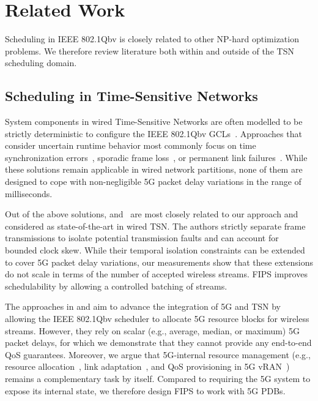 \section{Related Work}
\label{sec:related_work}
Scheduling in IEEE 802.1Qbv is closely related to other NP-hard optimization problems.
We therefore review literature both within and outside of the TSN scheduling domain.

\subsection{Scheduling in Time-Sensitive Networks}
System components in wired Time-Sensitive Networks are often modelled to be strictly deterministic to configure the IEEE 802.1Qbv GCLs~\cite{nwps,10228875,10.1145/3139258.3139289,8894249}.
Approaches that consider uncertain runtime behavior most commonly focus on time synchronization errors~\cite{10228980,10144237,Craciunas2016RTNS}, sporadic frame loss~\cite{Craciunas2016RTNS,10.1145/3458768,FENG2022102381,9488750}, or permanent link failures~\cite{9488750,8607244,8474201,reusch2022dependability}.
While these solutions remain applicable in wired network partitions, none of them are designed to cope with non-negligible 5G packet delay variations in the range of milliseconds.

Out of the above solutions, \cite{nwps} and~\cite{Craciunas2016RTNS} are most closely related to our approach and considered as state-of-the-art in wired TSN.
The authors strictly separate frame transmissions to isolate potential transmission faults and can account for bounded clock skew.
While their temporal isolation constraints can be extended to cover 5G packet delay variations, our measurements show that these extensions do not scale in terms of the number of accepted wireless streams.
FIPS improves schedulability by allowing a controlled batching of streams.

The approaches in \cite{9212049} and \cite{9940254} aim to advance the integration of 5G and TSN by allowing the IEEE 802.1Qbv scheduler to allocate 5G resource blocks for wireless streams.
However, they rely on scalar (e.g., average, median, or maximum) 5G packet delays, for which we demonstrate that they cannot provide any end-to-end QoS guarantees. 
Moreover, we argue that 5G-internal resource management (e.g., resource allocation~\cite{8736403}, link adaptation~\cite{9488790}, and QoS provisioning in 5G vRAN~\cite{infocom24_5gvran}) remains a complementary task by itself.
Compared to requiring the 5G system to expose its internal state, we therefore design FIPS to work with 5G PDBs.

